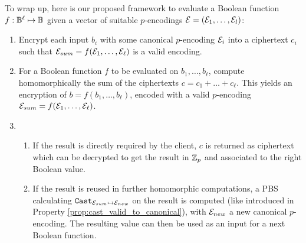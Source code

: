 To wrap up, here is our proposed framework to evaluate a Boolean function $f: \mathbb{B}^\ell \mapsto \mathbb{B}$ given a vector of suitable $p$-encodings $\mathcal{E} = (\mathcal{E}_1, \dots, \mathcal{E}_l)$:

\begin{enumerate}
\item Encrypt each input $b_i$ with some canonical $p$-encoding $\mathcal{E}_i$ into a ciphertext $c_i$ such that $\mathcal{E}_{sum} = f(\mathcal{E}_1, \dots, \mathcal{E}_\ell)$ is a valid encoding.
\item For a Boolean function $f$ to be evaluated on $b_1, \dots, b_\ell$, compute homomorphically the sum of the ciphertexts $c = c_1 + \dots + c_\ell$. This yields an encryption of $b = f(b_1, \dots, b_\ell)$, encoded with a valid $p$-encoding $\mathcal{E}_{sum} = f(\mathcal{E}_1, \dots, \mathcal{E}_\ell)$.
\item \begin{enumerate}
    \item If the result is directly required by the client, $c$ is returned as ciphertext which can be decrypted to get the result in $\mathbb{Z}_p$ and associated to the right Boolean value.
    \item If the result is reused in further homomorphic computations, a PBS calculating $\texttt{Cast}_{\mathcal{E}_{sum} \mapsto \mathcal{E}_{new}}$ on the result is computed (like introduced in Property \ref{prop:cast_valid_to_canonical}), with $\mathcal{E}_{new}$ a new canonical $p$-encoding. The resulting value can then be used as an input for a next Boolean function.
    \end{enumerate}
\end{enumerate}

